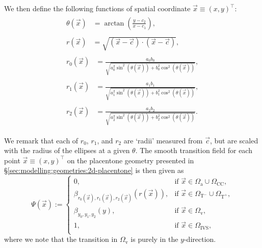     We then define the following functions of spatial coordinate $\vec{x} \equiv (x, y)^\intercal$:
    \begin{align}
        \begin{split}
            \theta(\vec{x}) & = \arctan{\left(\frac{y-c_2}{x-c_1}\right)},
        \end{split}\\
        \begin{split}
            r(\vec{x}) & = \sqrt{(\vec{x} - \vec{c}) \cdot (\vec{x} - \vec{c})},
        \end{split}\\
        \begin{split}
            r_0(\vec{x}) & = \frac{a_0 b_0}{\sqrt{a_0^2 \sin^2(\theta(\vec{x})) + b_0^2 \cos^2(\theta(\vec{x}))}},
        \end{split}\\
        \begin{split}
            r_1(\vec{x}) & = \frac{a_1 b_1}{\sqrt{a_1^2 \sin^2(\theta(\vec{x})) + b_1^2 \cos^2(\theta(\vec{x}))}},
        \end{split}\\
        \begin{split}
            r_2(\vec{x}) & = \frac{a_2 b_2}{\sqrt{a_2^2 \sin^2(\theta(\vec{x})) + b_2^2 \cos^2(\theta(\vec{x}))}}.
        \end{split}
    \end{align}
    
    We remark that each of $r_0$, $r_1$, and $r_2$ are `radii' measured from $\vec{c}$, but are scaled with the radius of the ellipses at a given $\theta$. The smooth transition field for each point $\vec{x} \equiv (x, y)^\intercal$ on the placentone geometry presented in \S\ref{sec:modelling:geometries:2d-placentone} is then given as 
    \begin{equation}
        \Psi(\vec{x}) := 
        \begin{cases}
            0, & \text{if } \vec{x} \in \Omega_\text{a} \cup \Omega_\text{CC}, \\
            \beta_{r_0(\vec{x}),r_1(\vec{x}),r_2(\vec{x})}(r(\vec{x})), & \text{if } \vec{x} \in \Omega_{\text{T}^-} \cup \Omega_{\text{T}^+}, \\
            \beta_{y_0,y_1,y_2}(y), & \text{if } \vec{x} \in \Omega_\text{v}, \\
            1, & \text{if } \vec{x} \in \Omega_\text{IVS}, \\
        \end{cases}
        \label{eq:smooth-transition}
    \end{equation}
    where we note that the transition in $\Omega_\text{v}$ is purely in the $y$-direction.
    
